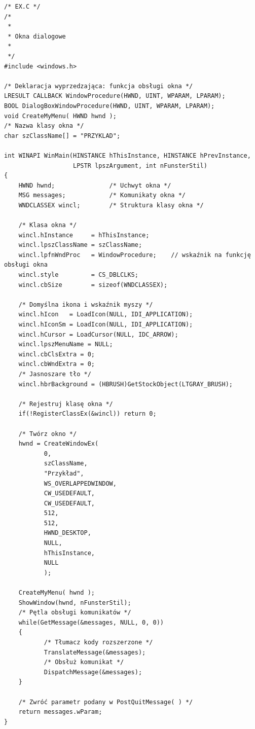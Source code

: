 \begin{scriptsize}
\begin{verbatim}
/* EX.C */
/*
 *
 * Okna dialogowe
 *
 */
#include <windows.h>

/* Deklaracja wyprzedzająca: funkcja obsługi okna */
LRESULT CALLBACK WindowProcedure(HWND, UINT, WPARAM, LPARAM);
BOOL DialogBoxWindowProcedure(HWND, UINT, WPARAM, LPARAM);
void CreateMyMenu( HWND hwnd );
/* Nazwa klasy okna */
char szClassName[] = "PRZYKLAD";

int WINAPI WinMain(HINSTANCE hThisInstance, HINSTANCE hPrevInstance, 
                   LPSTR lpszArgument, int nFunsterStil)
{
    HWND hwnd;               /* Uchwyt okna */
    MSG messages;            /* Komunikaty okna */
    WNDCLASSEX wincl;        /* Struktura klasy okna */

    /* Klasa okna */
    wincl.hInstance     = hThisInstance;
    wincl.lpszClassName = szClassName;
    wincl.lpfnWndProc   = WindowProcedure;    // wskaźnik na funkcję obsługi okna  
    wincl.style         = CS_DBLCLKS;                 
    wincl.cbSize        = sizeof(WNDCLASSEX);

    /* Domyślna ikona i wskaźnik myszy */
    wincl.hIcon   = LoadIcon(NULL, IDI_APPLICATION);
    wincl.hIconSm = LoadIcon(NULL, IDI_APPLICATION);
    wincl.hCursor = LoadCursor(NULL, IDC_ARROW);
    wincl.lpszMenuName = NULL; 
    wincl.cbClsExtra = 0;   
    wincl.cbWndExtra = 0;   
    /* Jasnoszare tło */
    wincl.hbrBackground = (HBRUSH)GetStockObject(LTGRAY_BRUSH);

    /* Rejestruj klasę okna */
    if(!RegisterClassEx(&wincl)) return 0;

    /* Twórz okno */
    hwnd = CreateWindowEx(
           0,                   
           szClassName,         
           "Przykład",       
           WS_OVERLAPPEDWINDOW, 
           CW_USEDEFAULT,       
           CW_USEDEFAULT,       
           512,                 
           512,                 
           HWND_DESKTOP,        
           NULL,                
           hThisInstance,       
           NULL                 
           );

    CreateMyMenu( hwnd );
    ShowWindow(hwnd, nFunsterStil);
    /* Pętla obsługi komunikatów */
    while(GetMessage(&messages, NULL, 0, 0))
    {
           /* Tłumacz kody rozszerzone */
           TranslateMessage(&messages);
           /* Obsłuż komunikat */
           DispatchMessage(&messages);
    }

    /* Zwróć parametr podany w PostQuitMessage( ) */
    return messages.wParam;
}


\end{verbatim}
\end{scriptsize}
